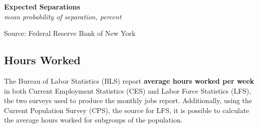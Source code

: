 \documentclass{report}
\makeatletter
\newcommand{\tbllink}[1]{\href{https://raw.githubusercontent.com/bdecon/US-chartbook/master/chartbook/data/#1}{\faTable}}
\newcommand*\short[1]{\expandafter\@gobbletwo\number\numexpr#1\relax}
\newcommand{\absnode}[3]{\node[below right, align=left] at (axis cs: #1,#2) {#3};}
\newcommand{\ltdateaxisticks}{
		date coordinates in=x, axis line style={draw=none},
		xmax={2024-01-31},
		max space between ticks=40,	    
		xtick={{2013-01-01}, {2014-01-01}, {2015-01-01}, {2016-01-01}, 
			{2017-01-01}, {2018-01-01}, {2019-01-01}, {2020-01-01}, {2021-01-01},
			{2022-01-01}, {2023-01-01}, {2024-01-01}},
		enlarge y limits={0.06}, enlarge x limits={0.01},
		xticklabel style={align=center, yshift=-2pt}, tick label style={inner sep=0pt},
		}
\newcommand{\bbar}[2]{extra #1 ticks = {{#2}}, extra #1 tick labels = ,
		extra #1 tick style = {grid=major, grid style={thick, black!25}},}
\newcommand{\stdline}[4]{\addplot[very thick, no markers, color=#1] 
		table [x=#2, y=#3, col sep=comma] {#4};	}
\newcommand{\rbar}{
		\fill[color=black!10] (axis cs:{2020-02-01},\pgfkeysvalueof{/pgfplots/ymin}) 
			rectangle (axis cs:{2020-05-01}, \pgfkeysvalueof{/pgfplots/ymax});}
\makeatother
\begin{document}
{\begin{minipage}{0.34\textwidth}
\small 
\end{minipage}\hspace{6mm}
\begin{minipage}{0.38\textwidth}
\normalsize \textbf{Expected Separations}\\
\footnotesize{\textit{mean probability of separation, percent}}
\vspace{4.0cm}

\hspace{2mm} 

\footnotesize{Source: Federal Reserve Bank of New York} \hfill \tbllink{sce_job_separation.csv} 
\end{minipage}
\newpage
\hypertarget{labh}{\label{labh}}
\subsection*{Hours Worked}   
\begin{minipage}{1.0\textwidth}
\small The Bureau of Labor Statistics (BLS) report \textbf{average hours worked per week} in both Current Employment Statistics (CES) and Labor Force Statistics (LFS), the two surveys used to produce the monthly jobs report. Additionally, using the Current Population Survey (CPS), the source for LFS, it is possible to calculate the average hours worked for subgroups of the population.
\end{minipage}

\begin{minipage}{0.31\textwidth}
\small  

 


\end{minipage}}
\end{document}
